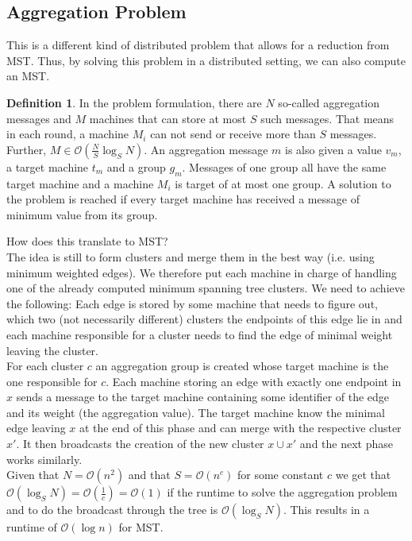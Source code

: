 \documentclass[a4paper, 12pt]{article}
\theoremstyle{plain}
\theoremstyle{definition}
\newtheorem{definition}[theorem]{Definition} %
\theoremstyle{lemma}
\theoremstyle{remark}
\theoremstyle{corollary}
\theoremstyle{example}
\begin{document}
	\subsection{Aggregation Problem}
	This is a different kind of distributed problem that allows for a reduction from MST. Thus, by solving this problem in a distributed setting, we can also compute an MST.
	\begin{definition}
		In the problem formulation, there are $N$ so-called aggregation messages and $M$ machines that can store at most $S$ such messages. That means in each round, a machine $M_i$ can not send or receive more than $S$ messages. Further, $M \in \mathcal{O}(\frac{N}{S} \log_S N)$. An aggregation message $m$ is also given a value $v_m$, a target machine $t_m$ and a group $g_m$. Messages of one group all have the same target machine and a machine $M_i$ is target of at most one group. A solution to the problem is reached if every target machine has received a message of minimum value from its group.
	\end{definition}
	How does this translate to MST?\\
	The idea is still to form clusters and merge them in the best way (i.e. using minimum weighted edges). We therefore put each machine in charge of handling one of the already computed minimum spanning tree clusters. We need to achieve the following: Each edge is stored by some machine that needs to figure out, which two (not necessarily different) clusters the endpoints of this edge lie in and each machine responsible for a cluster needs to find the edge of minimal weight leaving the cluster.\\
	For each cluster $c$ an aggregation group is created whose target machine is the one responsible for $c$. Each machine storing an edge with exactly one endpoint in $x$ sends a message to the target machine containing some identifier of the edge and its weight (the aggregation value). The target machine know the minimal edge leaving $x$ at the end of this phase and can merge with the respective cluster $x'$. It then broadcasts the creation of the new cluster $x\cup x'$ and the next phase works similarly.\\
	Given that $N = \mathcal{O}(n^2)$ and that $S = \mathcal{O}(n^c)$ for some constant $c$ we get that $\mathcal{O}(\log_S N) = \mathcal{O}(\frac{1}{c}) = \mathcal{O}(1)$ if the runtime to solve the aggregation problem and to do the broadcast through the tree is $\mathcal{O}(\log_S N)$. This results in a runtime of $\mathcal{O}(\log n)$ for MST. \\
\end{document}

